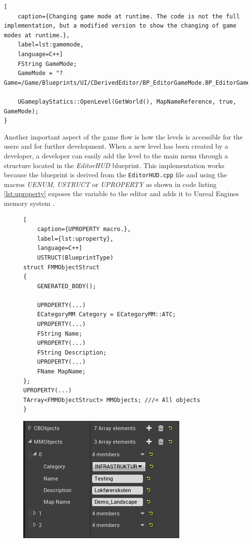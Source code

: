 \begin{lstlisting}[
    caption={Changing game mode at runtime. The code is not the full implementation, but a modified version to show the changing of game modes at runtime.},
    label=lst:gamemode,
    language=C++]
    FString GameMode;
	GameMode = "?Game=/Game/Blueprints/UI/CDerivedEditor/BP_EditorGameMode.BP_EditorGameMode_C";

	UGameplayStatics::OpenLevel(GetWorld(), MapNameReference, true, GameMode);
}
\end{lstlisting}

Another important aspect of the game flow is how the levels is accessible for the users and for further development. When a new level has been created by a developer, a developer can easily add the level to the main menu through a structure located in the \textit{EditorHUD} blueprint. This implementation works because the blueprint is derived from the \verb|EditorHUD.cpp| file and using the macros \textit{UENUM}, \textit{USTRUCT} or \textit{UPROPERTY} as shown in code listing \ref{lst:uproperty} exposes the variable to the editor and adds it to Unreal Engines memory system \cite{uproperty_macro_explanation}. 

\begin{figure}[H]
\centering
  \begin{minipage}{.48\textwidth}
  \begin{lstlisting}[
    caption={UPROPERTY macro.},
    label={lst:uproperty},
    language=C++]
    USTRUCT(BlueprintType)
struct FMMObjectStruct
{
    GENERATED_BODY();

    UPROPERTY(...)
    ECategoryMM Category = ECategoryMM::ATC;
    UPROPERTY(...)	
    FString Name;
	UPROPERTY(...)
	FString Description;
	UPROPERTY(...)
	FName MapName;
};
UPROPERTY(...)
TArray<FMMObjectStruct> MMObjects; ///< All objects
}
\end{lstlisting}
  \label{fig:test2}
\end{minipage}
\begin{minipage}{.48\textwidth}
  \centering
    \includegraphics[width=0.90\linewidth]{figures/EditorHUD_MMObjects.PNG}
  \label{editorMMobj}
  \end{minipage}
\end{figure}

